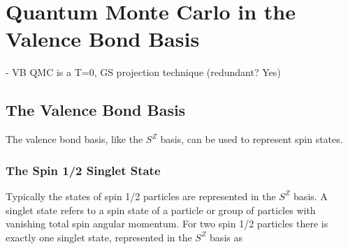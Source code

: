 \chapter{Quantum Monte Carlo in the Valence Bond Basis}

{\color{red} - VB QMC is a T=0, GS projection technique (redundant? Yes)}
\\
\section{The Valence Bond Basis}

{\color{red} The valence bond basis, like the $S^Z$ basis, can be used to represent spin states.}
\subsection{The Spin 1/2 Singlet State}

Typically the states of spin 1/2 particles are represented in the $S^Z$ basis.  
A singlet state refers to a spin state of a particle or group of particles with vanishing total spin angular momentum.
For two spin 1/2 particles there is exactly one singlet state, represented in the $S^Z$ basis as

